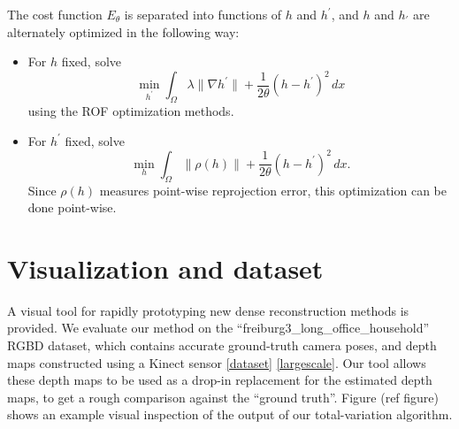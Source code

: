 \documentclass[conference]{IEEEtran}
\begin{document}
The cost function $E_\theta$ is separated into functions of $h$ and $h^\prime$,
and $h$ and $h_\prime$ are alternately optimized in the following way:
\begin{itemize}
    \item For $h$ fixed, solve
        $$\min_{h^\prime} \int_\Omega \lambda \|\nabla h^\prime\| + \frac{1}{2\theta}(h - h^\prime)^2\,dx$$
    using the ROF optimization methods.
    \item For $h^\prime$ fixed, solve
        $$\min_h \int_\Omega \|\rho(h)\| + \frac{1}{2\theta}(h - h^\prime)^2\,dx.$$
        Since $\rho(h)$ measures point-wise reprojection error, this
        optimization can be done point-wise.
\end{itemize}


\section{Visualization and dataset}
A visual tool for rapidly prototyping new dense reconstruction methods is provided.
We evaluate our method on the ``freiburg3\_long\_office\_household'' RGBD dataset, which contains accurate ground-truth camera poses, and
depth maps constructed using a Kinect sensor \ref{dataset} \ref{largescale}. Our tool allows these depth maps to be used as a drop-in replacement for the estimated
depth maps, to get a rough comparison against the ``ground truth''. Figure (ref figure) shows an example visual inspection of the output
of our total-variation algorithm.
\end{document}
